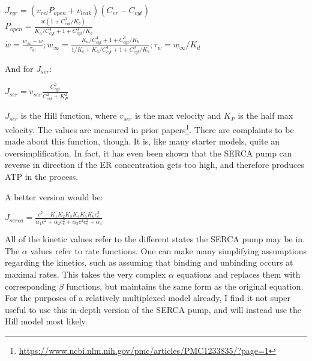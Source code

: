 \documentclass[12pt]{amsart}
\begin{document}
\bigskip
\begin{center}

    $J_{ryr} = (v_{rel}P_{open} + v_{leak})(C_{er} - C_{cyt})$\\
    \smallskip
    $P_{open} = \frac{w(1 + C^3_{cyt} / K_b)}{K_a / C^4_{cyt} + 1 + C_{cyt}^3/ K_b}$\\
    \smallskip
    $\dot{w} = \frac{w_{\infty} - w}{\tau_w}; w_{\infty} = \frac{K_a / C^4_{cyt} + 1 + C_{cyt}^3/ K_b}{1/K_c + K_a / C^4_{cyt} + 1 + C_{cyt}^3/ K_b}; \tau_w = w_{\infty}/K_d$
    
\end{center}

And for $J_{ser}$:

\begin{center}

    $J_{ser} = v_{ser}\frac{C^2_{cyt}}{C^2_{cyt} + K^2_P}$\\
    
\end{center}

\bigskip

 $J_{ser}$ is the Hill function, where $v_{ser}$ is the max velocity and $K_P$ is the half max velocity. The values are measured in prior papers\footnote{\url{https://www.ncbi.nlm.nih.gov/pmc/articles/PMC1233835/?page=1}}. There are complaints to be made about this function, though. It is, like many starter models, quite an oversimplification. In fact, it has even been shown that the SERCA pump can reverse in direction if the ER concentration gets too high, and therefore produces ATP in the process. \newline

 A better version would be: 

 \bigskip

 \begin{center}

    $J_{serca} = \frac{c^2 - K_1K_2K_3K_4K_5K_6c_e^2}{\alpha_1c^2 + \alpha_2c_e^2 + \alpha_3c^2c^2_e + \alpha_4}$
     
 \end{center}

 \bigskip

 All of the kinetic values refer to the different states the SERCA pump may be in. The $\alpha$ values refer to rate functions. One can make many simplifying assumptions regarding the kinetics, such as assuming that binding and unbinding occurs at maximal rates. This takes the very complex $\alpha$ equations and replaces them with corresponding $\beta$ functions, but maintains the same form as the original equation. For the purposes of a relatively multiplexed model already, I find it not super useful to use this in-depth version of the SERCA pump, and will instead use the Hill model most likely.
\end{document}
